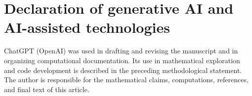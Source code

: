 \documentclass[11pt]{amsart}
\theoremstyle{definition}
\theoremstyle{remark}
\begin{document}
\section*{Declaration of generative AI and AI-assisted technologies}

ChatGPT (OpenAI) was used in drafting and revising the manuscript and in
organizing computational documentation. Its use in mathematical
exploration and code development is described in the preceding
methodological statement. The author is responsible for the mathematical
claims, computations, references, and final text of this article.



\providecommand{\bysame}{\leavevmode\hbox to3em{\hrulefill}\thinspace}
\providecommand{\MR}{\relax\ifhmode\unskip\space\fi MR }
\providecommand{\MRhref}[2]{%
  \href{http://www.ams.org/mathscinet-getitem?mr=#1}{#2}
}
\providecommand{\href}[2]{#2}
\end{document}
